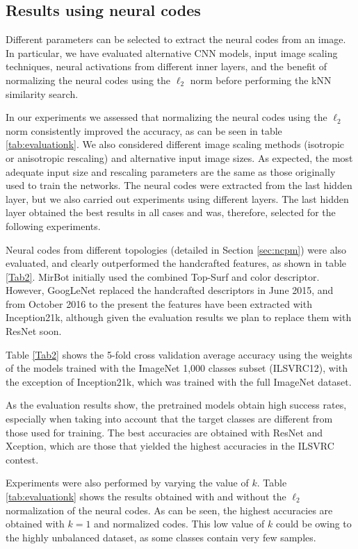 \documentclass[final, twocolumn]{elsarticle}
\begin{document}
\subsection{Results using neural codes}

Different parameters can be selected to extract the neural codes from an image. In particular, we have evaluated alternative CNN models, input image scaling techniques, neural activations from different inner layers, and the benefit of normalizing the neural codes using the $\ell_2$ norm before performing the kNN similarity search. 

In our experiments we assessed that normalizing the neural codes using the $\ell_2$ norm consistently improved the accuracy, as can be seen in table \ref{tab:evaluationk}. We also considered different image scaling methods (isotropic or anisotropic rescaling) and alternative input image sizes. As expected, the most adequate input size and rescaling parameters are the same as those originally used to train the networks. The neural codes were extracted from the last hidden layer, but we also carried out experiments using different layers. The last hidden layer obtained the best results in all cases and was, therefore, selected for the following experiments. 

Neural codes from different topologies (detailed in Section \ref{sec:ncpm}) were also evaluated, and clearly outperformed the handcrafted features, as shown in table \ref{Tab2}. MirBot initially used the combined Top-Surf and color descriptor. However, GoogLeNet replaced the handcrafted descriptors in June 2015, and from October 2016 to the present the features have been extracted with Inception21k, although given the evaluation results we plan to replace them with ResNet soon.

Table \ref{Tab2} shows the 5-fold cross validation average accuracy using the weights of the models trained with the ImageNet 1,000 classes subset (ILSVRC12), with the exception of Inception21k, which was trained with the full ImageNet dataset.

As the evaluation results show, the pretrained models obtain high success rates, especially when taking into account that the target classes are different from those used for training. The best accuracies are obtained with ResNet and Xception, which are those that yielded the highest accuracies in the ILSVRC contest.

Experiments were also performed by varying the value of $k$. Table \ref{tab:evaluationk} shows the results obtained with and without the $\ell_2$ normalization of the neural codes. As can be seen, the highest accuracies are obtained with $k=1$ and normalized codes. This low value of $k$ could be owing to the highly unbalanced dataset, as some classes contain very few samples. 
\end{document}
